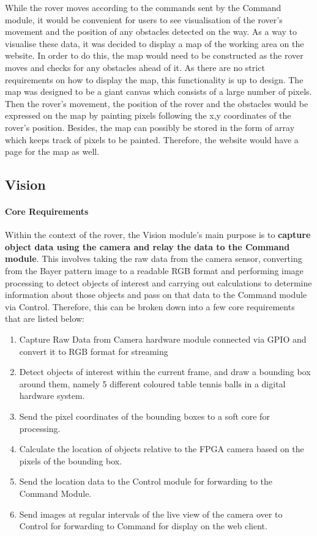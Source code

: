 \documentclass[a4paper]{article}
\begin{document}
While the rover moves according to the commands sent by the Command module, it would be convenient for 
users to see visualisation of the rover's movement and the position of any obstacles detected 
on the way. As a way to visualise these data, it was decided to display a map of the working area on 
the website. In order to do this, the map would need to be constructed as the rover moves and checks 
for any obstacles ahead of it. As there are no strict requirements on how to display the map, 
this functionality is up to design. The map was designed to be a giant canvas which consists of a large 
number of pixels. Then the rover's movement, the position of the rover and the obstacles would be expressed 
on the map by painting pixels following the x,y coordinates of the rover's position. Besides, the 
map can possibly be stored in the form of array which keeps track of pixels to be painted. Therefore, the 
website would have a page for the map as well. 

\subsection{Vision}
\paragraph*{Core Requirements}

Within the context of the rover, the Vision module's main purpose is to \textbf{capture 
object data using the camera and relay the data to the Command module}. This involves 
taking the raw data from the camera sensor, converting from the Bayer pattern image to 
a readable RGB format and performing image processing to detect objects of interest and
carrying out calculations to determine information about those objects and pass on 
that data to the Command module via Control. Therefore, this can be broken down into a few
core requirements that are listed below:

\begin{enumerate}
    \item Capture Raw Data from Camera hardware module connected via GPIO and convert 
    it to RGB format for streaming
    \item Detect objects of interest within the current frame, and draw a bounding box around them, 
    namely 5 different coloured table tennis balls in a digital hardware system.
    \item Send the pixel coordinates of the bounding boxes to a soft core for processing.
    \item Calculate the location of objects relative to the FPGA camera based on the 
    pixels of the bounding box. 
    \item Send the location data to the Control module for forwarding to the Command Module. 
    \item Send images at regular intervals of the live view of the camera over to Control for
    forwarding to Command for display on the web client.
\end{enumerate}
\end{document}
